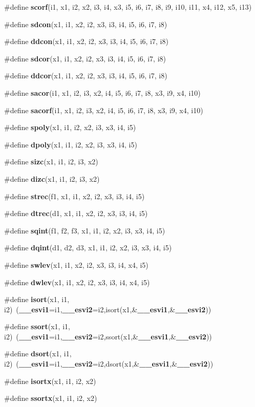 \begin{CompactItemize}
\item 
\#define {\bf scorf}(i1, x1, i2, x2, i3, i4, x3, i5, i6, i7, i8, i9, i10, i11, x4, i12, x5, i13)
\item 
\#define {\bf sdcon}(x1, i1, x2, i2, x3, i3, i4, i5, i6, i7, i8)
\item 
\#define {\bf ddcon}(x1, i1, x2, i2, x3, i3, i4, i5, i6, i7, i8)
\item 
\#define {\bf sdcor}(x1, i1, x2, i2, x3, i3, i4, i5, i6, i7, i8)
\item 
\#define {\bf ddcor}(x1, i1, x2, i2, x3, i3, i4, i5, i6, i7, i8)
\item 
\#define {\bf sacor}(i1, x1, i2, i3, x2, i4, i5, i6, i7, i8, x3, i9, x4, i10)
\item 
\#define {\bf sacorf}(i1, x1, i2, i3, x2, i4, i5, i6, i7, i8, x3, i9, x4, i10)
\item 
\#define {\bf spoly}(x1, i1, i2, x2, i3, x3, i4, i5)
\item 
\#define {\bf dpoly}(x1, i1, i2, x2, i3, x3, i4, i5)
\item 
\#define {\bf sizc}(x1, i1, i2, i3, x2)
\item 
\#define {\bf dizc}(x1, i1, i2, i3, x2)
\item 
\#define {\bf strec}(f1, x1, i1, x2, i2, x3, i3, i4, i5)
\item 
\#define {\bf dtrec}(d1, x1, i1, x2, i2, x3, i3, i4, i5)
\item 
\#define {\bf sqint}(f1, f2, f3, x1, i1, i2, x2, i3, x3, i4, i5)
\item 
\#define {\bf dqint}(d1, d2, d3, x1, i1, i2, x2, i3, x3, i4, i5)
\item 
\#define {\bf swlev}(x1, i1, x2, i2, x3, i3, i4, x4, i5)
\item 
\#define {\bf dwlev}(x1, i1, x2, i2, x3, i3, i4, x4, i5)
\item 
\#define {\bf isort}(x1, i1, i2)~({\bf \_\-\_\-esvi1}=i1,{\bf \_\-\_\-esvi2}=i2,isort(x1,\&{\bf \_\-\_\-esvi1},\&{\bf \_\-\_\-esvi2}))
\item 
\#define {\bf ssort}(x1, i1, i2)~({\bf \_\-\_\-esvi1}=i1,{\bf \_\-\_\-esvi2}=i2,ssort(x1,\&{\bf \_\-\_\-esvi1},\&{\bf \_\-\_\-esvi2}))
\item 
\#define {\bf dsort}(x1, i1, i2)~({\bf \_\-\_\-esvi1}=i1,{\bf \_\-\_\-esvi2}=i2,dsort(x1,\&{\bf \_\-\_\-esvi1},\&{\bf \_\-\_\-esvi2}))
\item 
\#define {\bf isortx}(x1, i1, i2, x2)
\item 
\#define {\bf ssortx}(x1, i1, i2, x2)
\item 

\end{CompactItemize}

